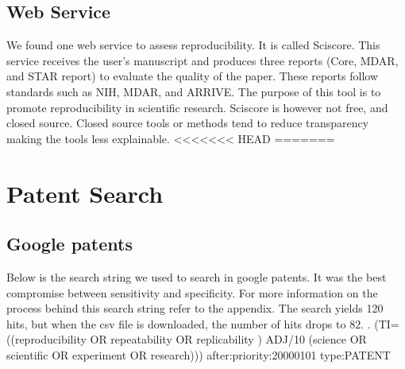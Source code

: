 \documentclass[
10pt, %
a4paper, %
oneside, %
headinclude,footinclude, %
BCOR5mm, %
]{scrartcl}
\begin{document}
\subsection{Web Service}
We found one web service to assess reproducibility. It is called Sciscore. This service receives the user’s manuscript and produces three reports (Core, MDAR, and STAR report) to evaluate the quality of the paper. These reports follow standards such as NIH, MDAR, and ARRIVE. The purpose of this tool is to promote reproducibility in scientific research. Sciscore is however not free, and closed source. Closed source tools or methods tend to reduce transparency making the tools less explainable. 
<<<<<<< HEAD
=======

\section{Patent Search}

\subsection{Google patents}
Below is the search string we used to search in google patents. It was the best compromise between sensitivity and specificity. For more information on the process behind this search string refer to the appendix. The search yields 120 hits, but when the csv file is downloaded, the number of hits drops to 82. .	(TI=((reproducibility OR repeatability OR replicability ) ADJ/10 (science OR scientific OR experiment OR research)))
 after:priority:20000101 type:PATENT
\end{document}

